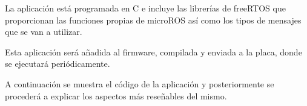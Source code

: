\documentclass[a4paper,11pt,spanish]{sphinxmanual}
\begin{document}
\sphinxAtStartPar
La aplicación está programada en C e incluye las librerías de freeRTOS
que proporcionan las funciones propias de micro\sphinxhyphen{}ROS así como los tipos de mensajes
que se van a utilizar.

\sphinxAtStartPar
Esta aplicación será añadida al firmware, compilada y enviada a la placa, donde
se ejecutará periódicamente.

\sphinxAtStartPar
A continuación se muestra el código de la aplicación y posteriormente se procederá
a explicar los aspectos más reseñables del mismo.

\begin{sphinxVerbatim}[commandchars=\\\{\},formatcom=\footnotesize]
 
 

 
 
 

 
 


 
 


\end{sphinxVerbatim}
\end{document}
